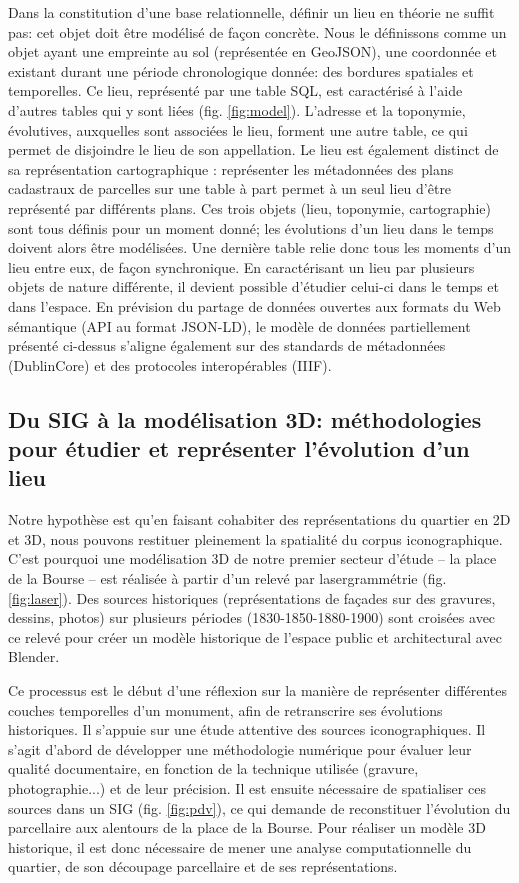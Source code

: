 \documentclass[11pt,french]{article}
\begin{document}
Dans la constitution d’une base relationnelle, définir un lieu en théorie ne suffit pas: cet objet doit être modélisé de façon concrète. Nous le définissons comme un objet ayant une empreinte au sol (représentée en GeoJSON), une coordonnée et existant durant une période chronologique donnée: des bordures spatiales et temporelles. Ce lieu, représenté par une table SQL, est caractérisé à l’aide d’autres tables qui y sont liées (fig. \ref{fig:model}). L’adresse et la toponymie, évolutives, auxquelles sont associées le lieu, forment une autre table, ce qui permet de disjoindre le lieu de son appellation. Le lieu est également distinct de sa représentation cartographique : représenter les métadonnées des plans cadastraux de parcelles sur une table à part permet à un seul lieu d’être représenté par différents plans. Ces trois objets (lieu, toponymie, cartographie) sont tous définis pour un moment donné; les évolutions d’un lieu dans le temps doivent alors être modélisées. Une dernière table relie donc tous les moments d’un lieu entre eux, de façon synchronique. En caractérisant un lieu par plusieurs objets de nature différente, il devient possible d’étudier celui-ci dans le temps et dans l’espace. En prévision du partage de données ouvertes aux formats du Web sémantique (API au format JSON-LD), le modèle de données partiellement présenté ci-dessus s’aligne également sur des standards de métadonnées (DublinCore) et des protocoles interopérables (IIIF).

\subsection{Du SIG à la modélisation 3D: méthodologies pour étudier et représenter l'évolution d'un lieu}
Notre hypothèse est qu’en faisant cohabiter des représentations du quartier en 2D et 3D, nous pouvons restituer pleinement la spatialité du corpus iconographique. C’est pourquoi une modélisation 3D de notre premier secteur d’étude -- la place de la Bourse -- est réalisée à partir d'un relevé par lasergrammétrie (fig. \ref{fig:laser}). Des sources historiques (représentations de façades sur des gravures, dessins, photos) sur plusieurs périodes (1830-1850-1880-1900) sont croisées avec ce relevé pour créer un modèle historique de l’espace public et architectural avec Blender. 

Ce processus est le début d’une réflexion sur la manière de représenter différentes couches temporelles d’un monument, afin de retranscrire ses évolutions historiques. Il s'appuie sur une étude attentive des sources iconographiques. Il s'agit d'abord de développer une méthodologie numérique pour évaluer leur qualité documentaire, en fonction de la technique utilisée (gravure, photographie...) et de leur précision. Il est ensuite nécessaire de spatialiser ces sources dans un SIG (fig. \ref{fig:pdv}), ce qui demande de reconstituer l'évolution du parcellaire aux alentours de la place de la Bourse. Pour réaliser un modèle 3D historique, il est donc nécessaire de mener une analyse computationnelle du quartier, de son découpage parcellaire et de ses représentations.
\end{document}
